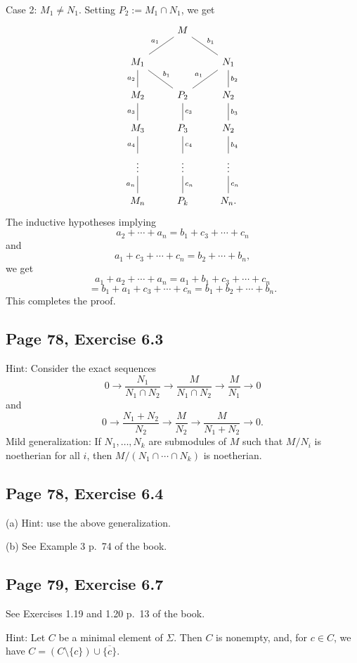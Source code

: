 \documentclass[parskip=half,fontsize=12pt]{scrartcl}%
\begin{document}
Case 2: $M_1\ne N_1$. Setting $P_2:=M_1\cap N_1$, we get 
$$
\begin{tikzcd}
&M\ar[dl,dash,"a_1"']\ar[dr,dash,"b_1"]\\ 
M_1\ar[d,dash,"a_2"']\ar[dr,dash,"b_1"]&&N_1\ar[d,dash,"b_2"]\ar[dl,dash,"a_1"']\\ 
M_2\ar[d,dash,"a_3"']&P_2\ar[d,dash,"c_3"]&N_2\ar[d,dash,"b_3"]\\ 
M_3\ar[d,dash,"a_4"']&P_3\ar[d,dash,"c_4"]&N_2\ar[d,dash,"b_4"]\\ 
\vdots\ar[d,dash,"a_n"']&\vdots\ar[d,dash,"c_n"]&\vdots\ar[d,dash,"c_n"]\\ 
M_n&P_k&N_n.
\end{tikzcd}
$$ 
The inductive hypotheses implying 
$$
a_2+\cdots+a_n=b_1+c_3+\cdots+c_n
$$ 
and 
$$
a_1+c_3+\cdots+c_n=b_2+\cdots+b_n,%
$$ 
we get 
$$
a_1+a_2+\cdots+a_n=a_1+b_1+c_3+\cdots+c_n
$$ 
$$
=b_1+a_1+c_3+\cdots+c_n=b_1+b_2+\cdots+b_n.
$$ 
This completes the proof. 

\subsection{Page 78, Exercise 6.3}%

Hint: Consider the exact sequences 
$$
0\to\frac{N_1}{N_1\cap N_2}\to\frac M{N_1\cap N_2}\to\frac M{N_1}\to0
$$ 
and 
$$
0\to\frac{N_1+N_2}{N_2}\to\frac M{N_2}\to\frac M{N_1+N_2}\to0.
$$ 
Mild generalization: If $N_1,\dots,N_k$ are submodules of $M$ such that $M/N_i$ is noetherian for all $i$, then $M/(N_1\cap\cdots\cap N_k)$ is noetherian. 

\subsection{Page 78, Exercise 6.4}%

(a) Hint: use the above generalization.

(b) See Example 3 p.~74 of the book. 

\subsection{Page 79, Exercise 6.7}%

See Exercises 1.19 and 1.20 p.~13 of the book. 

Hint: Let $C$ be a minimal element of $\Sigma$. Then $C$ is nonempty, and, for $c\in C$, we have $C=(C\setminus\{c\})\cup\overline{\{c\}}$. 
\end{document}
